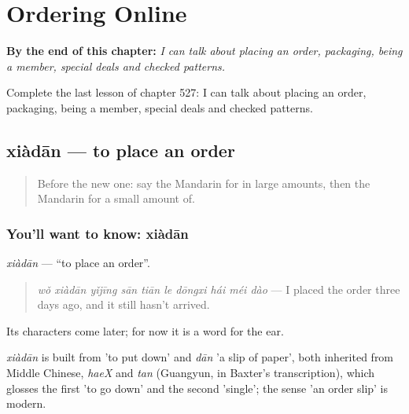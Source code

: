 
\chapter{Ordering Online}
\label{ch:zh-ordering-online}

\begin{chapteropening}
\textbf{By the end of this chapter:} \emph{I can talk about placing an order, packaging, being a member, special deals and checked patterns.}

Complete the last lesson of chapter 527: I can talk about placing an order, packaging, being a member, special deals and checked patterns.
\end{chapteropening}

\section[xiàdān]{xiàdān — to place an order}

\label{lesson:ZH-C527-xiadan}



\begin{quote}
Before the new one: say the Mandarin for in large amounts, then the Mandarin for a small amount of.
\end{quote}

\subsection*{You'll want to know: xiàdān}
\emph{xiàdān} — \textquotedblleft{}to place an order\textquotedblright{}.

\begin{quote}
\emph{wǒ xiàdān yǐjīng sān tiān le dōngxi hái méi dào} — I placed the order three days ago, and it still hasn't arrived.
\end{quote}

Its characters come later; for now it is a word for the ear.

\begin{cousinweb}
\emph{xiàdān} is built from  'to put down' and \emph{dān} 'a slip of paper', both inherited from Middle Chinese, \emph{haeX} and \emph{tan} (Guangyun, in Baxter's transcription), which glosses the first 'to go down' and the second 'single'; the sense 'an order slip' is modern.
\end{cousinweb}

